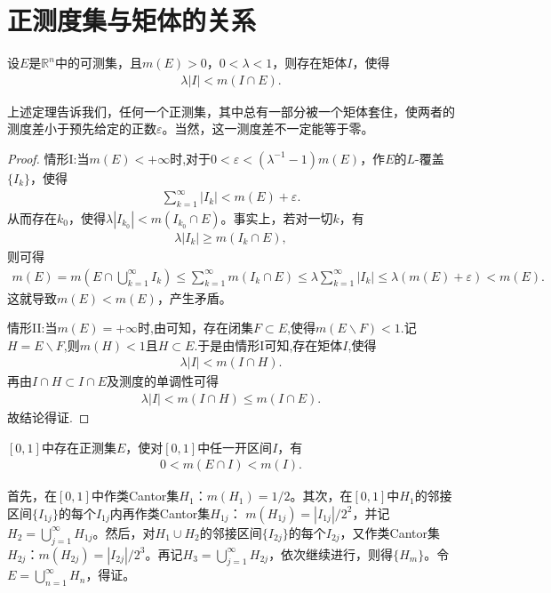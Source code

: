 \documentclass[../../main.tex]{subfiles}
\begin{document}
\section{正测度集与矩体的关系}

\begin{theorem}\label{theorem:定理2.19}
设\(E\)是\(\mathbb{R}^n\)中的可测集，且\(m(E)>0\)，\(0 < \lambda < 1\)，则存在矩体\(I\)，使得
\begin{align}
\lambda|I|<m(I\cap E).\label{eq:2.8}
\end{align}
\end{theorem}
\begin{remark}
上述定理告诉我们，任何一个正测集，其中总有一部分被一个矩体套住，使两者的测度差小于预先给定的正数\(\varepsilon\)。当然，这一测度差不一定能等于零。 
\end{remark}
\begin{proof}
{\heiti 情形I:}当\(m(E)<+\infty\)时,对于\(0 < \varepsilon < (\lambda^{-1}-1)m(E)\)，作\(E\)的\(L\)-覆盖\(\{I_k\}\)，使得
\begin{align*}
\sum_{k = 1}^{\infty}|I_k|<m(E)+\varepsilon.
\end{align*}
从而存在\(k_0\)，使得\(\lambda|I_{k_0}|<m(I_{k_0}\cap E)\)。事实上，若对一切\(k\)，有
\begin{align*}
\lambda|I_k|\geqslant m(I_k\cap E),
\end{align*}
则可得
\begin{align*}
m(E)=m(E\cap \bigcup_{k=1}^{\infty}I_k)\leqslant\sum_{k = 1}^{\infty}m(I_k\cap E)\leqslant\lambda\sum_{k = 1}^{\infty}|I_k|\leqslant\lambda(m(E)+\varepsilon)<m(E).
\end{align*}
这就导致\(m(E)<m(E)\)，产生矛盾。

{\heiti 情形II:}当$m(E)=+\infty$时,由可知，存在闭集$F\subset E$,使得$m(E\backslash F)<1$.记$H=E\backslash F$,则$m(H)<1$且$H\subset E$.于是由{\heiti 情形I}可知,存在矩体$I$,使得
\begin{align*}
\lambda |I|<m(I\cap H).
\end{align*}
再由$I\cap H\subset I\cap E$及测度的单调性可得
\begin{align*}
\lambda |I|<m(I\cap H)\leqslant m(I\cap E).
\end{align*}
故结论得证.
\end{proof}

\begin{example}
\([0,1]\)中存在正测集\(E\)，使对\([0,1]\)中任一开区间\(I\)，有
\begin{align*}
0 < m(E\cap I) < m(I).
\end{align*}
\end{example}
\begin{solution}
首先，在\([0,1]\)中作类Cantor集\(H_1\)：\(m(H_1)=1/2\)。其次，在\([0,1]\)中\(H_1\)的邻接区间\(\{I_{1j}\}\)的每个\(I_{1j}\)内再作类Cantor集\(H_{1j}\)：
\(m(H_{1j}) = |I_{1j}|/2^2\)，并记\(H_2 = \bigcup_{j = 1}^{\infty}H_{1j}\)。然后，对\(H_1\cup H_2\)的邻接区间\(\{I_{2j}\}\)的每个\(I_{2j}\)，又作类Cantor集\(H_{2j}\)：\(m(H_{2j}) = |I_{2j}|/2^3\)。再记\(H_3 = \bigcup_{j = 1}^{\infty}H_{2j}\)，依次继续进行，则得\(\{H_m\}\)。令\(E = \bigcup_{n = 1}^{\infty}H_n\)，得证。 
\end{solution}
\end{document}
